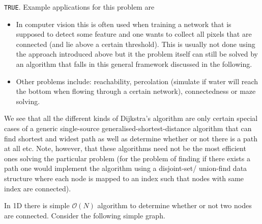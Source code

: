 \texttt{TRUE}. Example applications for this problem are
\begin{itemize}
\item In computer vision this is often used when training a network that is
  supposed to detect some feature and one wants to collect all pixels that are
  connected (and lie above a certain threshold). This is usually not done using
  the approach introduced above but it the problem itself can still be solved by
  an algorithm that falls in this general framework discussed in the following.
\item Other problems include: reachability, percolation (simulate if water will
  reach the bottom when flowing through a certain network), connectedness or
  maze solving.
\end{itemize}
We see that all the different kinds of Dijkstra's algorithm are only certain
special cases of a generic single-source generalised-shortest-distance algorithm
that can find shortest and widest path as well as determine whether or not there
is a path at all etc. Note, however, that these algorithms need not be the most
efficient ones solving the particular problem (\eg for the problem of finding if
there exists a path one would implement the algorithm using a disjoint-set/
union-find data structure where each node is mapped to an index such that nodes
with same index are connected).

In 1D there is simple $\mathcal{O}(N)$ algorithm to determine whether or not two
nodes are connected. Consider the following simple graph.  \vspace*{2em}
\begin{figure}[h!]
  \centering
\end{figure}

